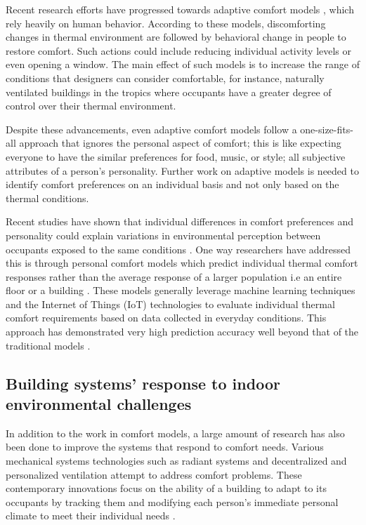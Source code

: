 \documentclass[]{interact}
\theoremstyle{plain}%
\theoremstyle{definition}
\theoremstyle{remark}
\begin{document}
Recent research efforts have progressed towards adaptive comfort models \citep{Ferrari2012AdaptiveIndices, Nicol2013AdaptiveWorld, vanHoof2010ThermalPractice}, which rely heavily on human behavior. According to these models, discomforting changes in thermal environment are followed by behavioral change in people to restore comfort. Such actions could include reducing individual activity levels or even opening a window. The main effect of such models is to increase the range of conditions that designers can consider comfortable, for instance, naturally ventilated buildings in the tropics where occupants have a greater degree of control over their thermal environment.

Despite these advancements, even adaptive comfort models follow a one-size-fits-all approach that ignores the personal aspect of comfort; this is like expecting everyone to have the similar preferences for food, music, or style; all subjective attributes of a person’s personality. Further work on adaptive models is needed to identify comfort preferences on an individual basis and not only based on the thermal conditions.  

Recent studies have shown that individual differences in comfort preferences and personality could explain variations in environmental perception between occupants exposed to the same conditions \cite{cheung2019analysis, livcina2018development}. One way researchers have addressed this is through personal comfort models which predict individual thermal comfort responses rather than the average response of a larger population i.e an entire floor or a building \cite{kim2018personal}. These models generally leverage  machine learning techniques and the Internet of Things (IoT) technologies to evaluate individual thermal comfort requirements based on data collected in everyday conditions. This approach has demonstrated very high prediction accuracy well beyond that of the traditional models \cite{kim2018personal1}.





\subsection{Building systems’ response to indoor environmental challenges}
In addition to the work in comfort models, a large amount of research has also been done to improve the systems that respond to comfort needs. Various mechanical systems technologies such as radiant systems and decentralized and personalized ventilation attempt to address comfort problems. These contemporary innovations focus on the ability of a building to adapt to its occupants by tracking them and modifying each person's immediate personal climate to meet their individual needs \citep{Brager2015EvolvingComfort}. 
\end{document}
